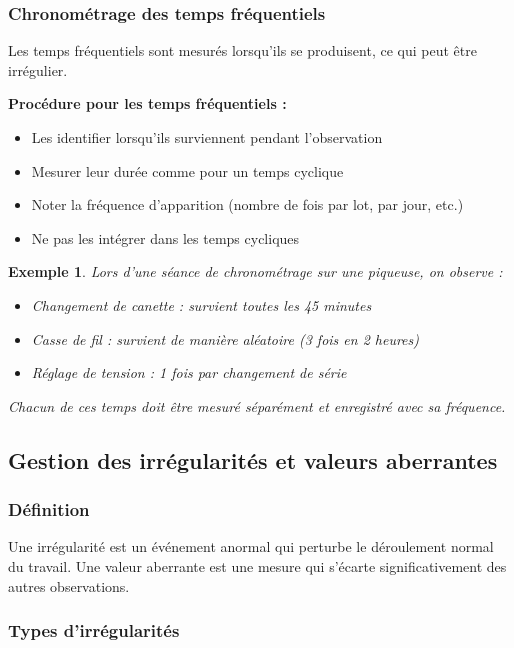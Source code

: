 \documentclass[a4paper,12pt]{article}
\newtheorem{exemple}{Exemple}[section]
\begin{document}
\subsubsection{Chronométrage des temps fréquentiels}

Les temps fréquentiels sont mesurés lorsqu'ils se produisent, ce qui peut être irrégulier.

\textbf{Procédure pour les temps fréquentiels :}
\begin{itemize}
    \item Les identifier lorsqu'ils surviennent pendant l'observation
    \item Mesurer leur durée comme pour un temps cyclique
    \item Noter la fréquence d'apparition (nombre de fois par lot, par jour, etc.)
    \item Ne pas les intégrer dans les temps cycliques
\end{itemize}

\begin{exemple}
Lors d'une séance de chronométrage sur une piqueuse, on observe :
\begin{itemize}
    \item Changement de canette : survient toutes les 45 minutes
    \item Casse de fil : survient de manière aléatoire (3 fois en 2 heures)
    \item Réglage de tension : 1 fois par changement de série
\end{itemize}
Chacun de ces temps doit être mesuré séparément et enregistré avec sa fréquence.
\end{exemple}

\subsection{Gestion des irrégularités et valeurs aberrantes}

\subsubsection{Définition}

Une irrégularité est un événement anormal qui perturbe le déroulement normal du travail. Une valeur aberrante est une mesure qui s'écarte significativement des autres observations.

\subsubsection{Types d'irrégularités}
\end{document}
